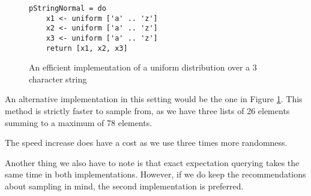 \begin{figure}[H]
\begin{center}
\begin{verbatim}
pStringNormal = do
    x1 <- uniform ['a' .. 'z']
    x2 <- uniform ['a' .. 'z']
    x3 <- uniform ['a' .. 'z']
    return [x1, x2, x3]
\end{verbatim}
\end{center}
\caption{An efficient implementation of a uniform distribution over a 3 character string}
\label{code:uniform-string-fast}
\end{figure}

An alternative implementation in this setting would be the one in Figure \ref{code:uniform-string-fast}.
This method is strictly faster to sample from, as we have three lists of 26 elements
summing to a maximum of 78 elements.

The speed increase does have a cost as we use three times more randomness.

Another thing we also have to note is that exact expectation querying takes
the same time in both implementations. However, if we do keep the recommendations
about sampling in mind, the second implementation is preferred.